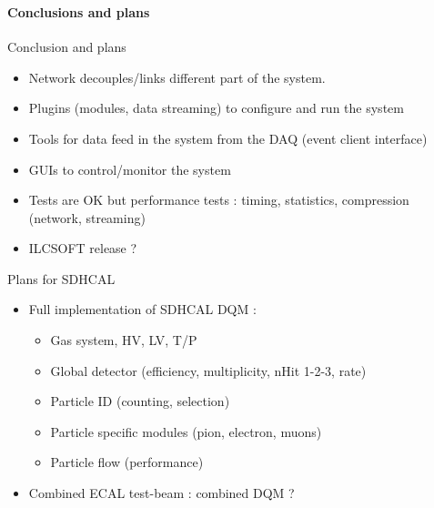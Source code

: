 \documentclass[8pt]{beamer}
\begin{document}
    
  \begin{frame}
  \frametitle{\secname}
  \framesubtitle{Conclusions and plans}

  \begin{block}{Conclusion and plans}
    \begin{itemize}
      \item Network decouples/links different part of the system.
      \item Plugins (modules, data streaming) to configure and run the system 
      \item Tools for data feed in the system from the DAQ (event client interface)
      \item GUIs to control/monitor the system
      \item Tests are OK but performance tests : timing, statistics, compression (network, streaming)
      \item ILCSOFT release ?
    \end{itemize}
  \end{block}
  
  \begin{block}{Plans for SDHCAL}
    \begin{itemize}
      \item Full implementation of SDHCAL DQM :
      \begin{itemize}
        \item Gas system, HV, LV, T/P
        \item Global detector (efficiency, multiplicity, nHit 1-2-3, rate)
        \item Particle ID (counting, selection)
        \item Particle specific modules (pion, electron, muons)
        \item Particle flow (performance)
      \end{itemize}
      \item Combined ECAL test-beam : combined DQM ?
    \end{itemize}
  \end{block}
  
  \end{frame}
\end{document}
